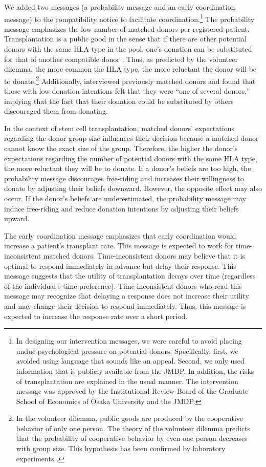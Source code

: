 \documentclass[12pt, a4paper]{article}
\begin{document}
We added two messages (a probability message and an early coordination message) to the compatibility notice to facilitate coordination.\footnote{In designing our intervention messages, we were careful to avoid placing undue psychological pressure on potential donors. Specifically, first, we avoided using language that sounds like an appeal. Second, we only used information that is publicly available from the JMDP. In addition, the risks of transplantation are explained in the usual manner. The intervention message was approved by the Institutional Review Board of the Graduate School of Economics of Osaka University and the JMDP.} The probability message emphasizes the low number of matched donors per registered patient. Transplantation is a public good in the sense that if there are other potential donors with the same HLA type in the pool, one's donation can be substituted for that of another compatible donor \citep{Bergstrom2009}. Thus, as predicted by the volunteer dilemma, the more common the HLA type, the more reluctant the donor will be to donate.\footnote{In the volunteer dilemma, public goods are produced by the cooperative behavior of only one person. The theory of the volunteer dilemma predicts that the probability of cooperative behavior by even one person decreases with group size. This hypothesis has been confirmed by laboratory experiments \citep{Diekmann1985, Diekmann1986, Franzen1999, Davis2017}.} Additionally, \citet{Kurosawa2022} interviewed previously matched donors and found that those with low donation intentions felt that they were ``one of several donors,'' implying that the fact that their donation could be substituted by others discouraged them from donating.

In the context of stem cell transplantation, matched donors' expectations regarding the donor group size influences their decision because a matched donor cannot know the exact size of the group. Therefore, the higher the donor's expectations regarding the number of potential donors with the same HLA type, the more reluctant they will be to donate. If a donor's beliefs are too high, the probability message discourages free-riding and increases their willingness to donate by adjusting their beliefs downward. However, the opposite effect may also occur. If the donor's beliefs are underestimated, the probability message may induce free-riding and reduce donation intentions by adjusting their beliefs upward.

The early coordination message emphasizes that early coordination would increase a patient's transplant rate. This message is expected to work for time-inconsistent matched donors. Time-inconsistent donors may believe that it is optimal to respond immediately in advance but delay their response. This message suggests that the utility of transplantation decays over time (regardless of the individual's time preference). Time-inconsistent donors who read this message may recognize that delaying a response does not increase their utility and may change their decision to respond immediately. Thus, this message is expected to increase the response rate over a short period.
\end{document}
